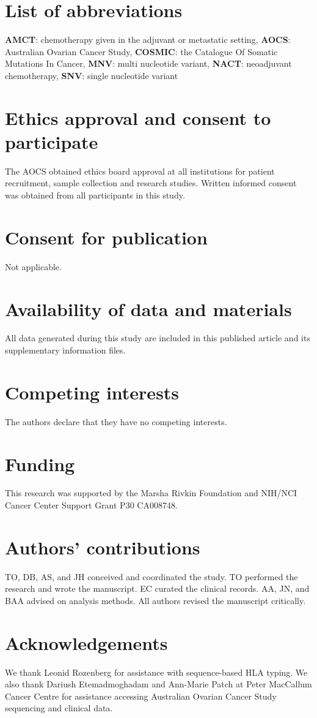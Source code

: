 \section{List of abbreviations}
\textbf{AMCT}: chemotherapy given in the adjuvant or metastatic setting, \textbf{AOCS}: Australian Ovarian Cancer Study, \textbf{COSMIC}: the Catalogue Of Somatic Mutations In Cancer, \textbf{MNV}: multi nucleotide variant, \textbf{NACT}: neoadjuvant chemotherapy, \textbf{SNV}: single nucleotide variant

\section{Ethics approval and consent to participate}
The AOCS obtained ethics board approval at all institutions for patient recruitment, sample collection and research studies. Written informed consent was obtained from all participants in this study.

\section{Consent for publication}
Not applicable.

\section{Availability of data and materials}
All data generated during this study are included in this published article and its supplementary information files.

\section{Competing interests}
The authors declare that they have no competing interests.

\section{Funding}
This research was supported by the Marsha Rivkin Foundation and NIH/NCI Cancer Center Support Grant P30 CA008748.

\section{Authors' contributions}
TO, DB, AS, and JH conceived and coordinated the study. TO performed the research and wrote the manuscript. EC curated the clinical records. AA, JN, and BAA advised on analysis methods.  All authors revised the manuscript critically.

\section{Acknowledgements}
We thank Leonid Rozenberg for assistance with sequence-based HLA typing. We also thank Dariush Etemadmoghadam and Ann-Marie Patch at Peter MacCallum Cancer Centre for assistance accessing Australian Ovarian Cancer Study sequencing and clinical data.
